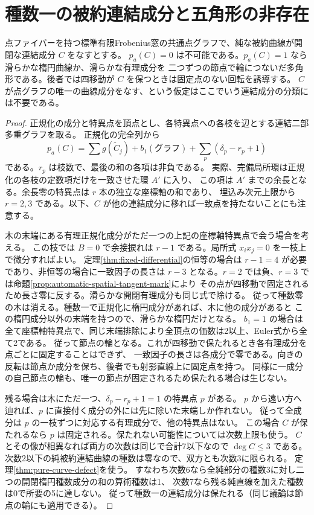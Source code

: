 \section{種数一の被約連結成分と五角形の非存在}
\label{sec:genus-one-polygon-exclusion}
\begin{theorem}\label{thm:reduced-genus-one-components}
点ファイバーを持つ標準有限Frobenius窓の共通点グラフで、純な被約曲線が開閉な連結成分 $C$ をなすとする。
$p_a(C)=0$ は不可能である。$p_a(C)=1$ なら滑らかな楕円曲線か、滑らかな有理成分を
二つずつの節点で輪につないだ多角形である。後者では四移動が $C$ を保つときは固定点のない回転を誘導する。
$C$ が点グラフの唯一の曲線成分をなす、という仮定はここでいう連結成分の分類には不要である。
\end{theorem}
\begin{proof}
正規化の成分と特異点を頂点とし、各特異点への各枝を辺とする連結二部多重グラフを取る。
正規化の完全列から
\[
 p_a(C)=\sum g(\widetilde C_j)+b_1(\text{グラフ})+
            \sum_p(\delta_p-r_p+1)
\]
である。$r_p$ は枝数で、最後の和の各項は非負である。
実際、完備局所環は正規化の各枝の定数項だけを一致させた環 $A'$ に入り、
この項は $A'$ までの余長となる。余長零の特異点は $r$ 本の独立な座標軸の和であり、
埋込み次元上限から $r=2,3$ である。以下、$C$ が他の連結成分に移れば一致点を持たないことにも注意する。

木の末端にある有理正規化成分がただ一つの上記の座標軸特異点で会う場合を考える。
この枝では $B=0$ で余接捩れは $r-1$ である。局所式 $x_i x_j=0$ を一枝上で微分すればよい。
定理\ref{thm:fixed-differential}の恒等の場合は $r-1=4$ が必要であり、非恒等の場合に一致因子の長さは
$r-3$ となる。$r=2$ では負、$r=3$ では命題\ref{prop:automatic-spatial-tangent-mark}により
その点が四移動で固定されるため長さ零に反する。滑らかな開閉有理成分も同じ式で除ける。
従って種数零の木は消える。種数一で正規化に楕円成分があれば、木に他の成分があると
この楕円成分以外の末端を持つので、滑らかな楕円だけとなる。
$b_1=1$ の場合は全て座標軸特異点で、同じ末端排除により全頂点の価数は2以上、Euler式から全て2である。
従って節点の輪となる。これが四移動で保たれるとき各有理成分を点ごとに固定することはできず、
一致因子の長さは各成分で零である。向きの反転は節点か成分を保ち、後者でも射影直線上に固定点を持つ。
同様に一成分の自己節点の輪も、唯一の節点が固定されるため保たれる場合は生じない。

残る場合は木にただ一つ、$\delta_p-r_p+1=1$ の特異点 $p$ がある。
$p$ から遠い方へ辿れば、$p$ に直接付く成分の外には先に除いた末端しか作れない。
従って全成分は $p$ の一枝ずつに対応する有理成分で、他の特異点はない。
この場合 $C$ が保たれるなら $p$ は固定される。保たれない可能性については次数上限も使う。
$C$ とその像が相異なれば両方の次数は同じで合計7以下なので $\deg C\le3$ である。
次数2以下の純被約連結曲線の種数は零なので、双方とも次数3に限られる。
定理\ref{thm:pure-curve-defect}を使う。
すなわち次数6なら全純部分の種数3に対し二つの開閉楕円種数成分の和の算術種数は1、
次数7なら残る純直線を加えた種数は0で所要の5に達しない。
従って種数一の連結成分は保たれる（同じ議論は節点の輪にも適用できる）。


\end{proof}
